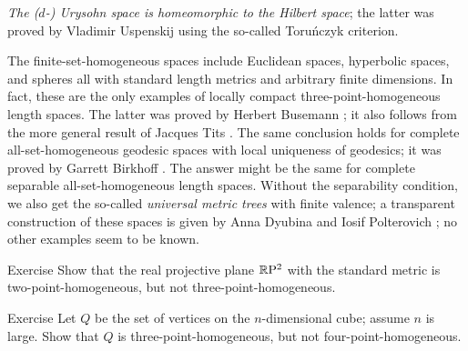 \textit{The ($d$-) Urysohn space is homeomorphic to the Hilbert space};
the latter was proved by Vladimir Uspenskij \cite{uspenskij} using the so-called Toruńczyk criterion.

The finite-set-homogeneous spaces include Euclidean spaces, hyperbolic spaces, and spheres all with standard length metrics and arbitrary finite dimensions.
In fact, these are the only examples of locally compact three-point-homogeneous length spaces.
The latter was proved by Herbert Busemann \cite{busemann-1942}; it also follows from the more general result of Jacques Tits \cite{tits}.
The same conclusion holds for complete all-set-homogeneous geodesic spaces with local uniqueness of geodesics;
it was proved by Garrett Birkhoff \cite{birkhoff}.
The answer might be the same for complete separable all-set-homogeneous length spaces.
Without the separability condition, we also get the so-called \emph{universal metric trees} with finite valence; 
a transparent construction of these spaces is given by Anna Dyubina and Iosif Polterovich \cite{dyubina-polterovich}; no other examples seem to be known.  

{\sloppy

\begin{thm}{Exercise}\label{ex:RP-not}
Show that the real projective plane $\mathbb{R}\mathrm{P}^2$ with the standard metric is two-point-homogeneous, but not three-point-homogeneous.
\end{thm}

}

\begin{thm}{Exercise}\label{ex:hom-cube}
Let $Q$ be the set of vertices on the $n$-dimensional cube;
assume $n$ is large.
Show that $Q$ is three-point-homogeneous, but not four-point-homogeneous.
\end{thm}

